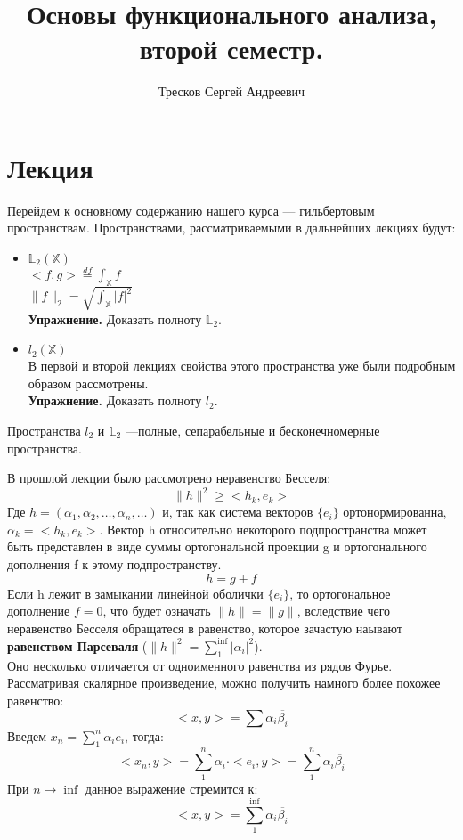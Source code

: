 \documentclass[12pt]{article}
\newcommand{\exc}{{\bfseries Упражнение. }}
\newcommand{\norm}[1]{\| #1 \|}
\newcommand{\scal}[2]{<#1, #2>}
\renewcommand{\geq}{\geqslant}
\begin{document}
	\title{Основы функционального анализа, второй семестр.}
	\author{Тресков Сергей Андреевич}
	\maketitle
	
	\section{Лекция}
	
	Перейдем к основному содержанию нашего курса --- гильбертовым пространствам. Пространствами, рассматриваемыми 
	в дальнейших лекциях будут:
	\begin{itemize}
		\item $\mathbb{L}_2(\mathbb{X})$ \\
		$\scal{f}{g} \overset{df}{=} \int_{\mathbb{X}} f$ \\
		$\norm{f}_2 = \sqrt{\int_{\mathbb{X}} |f|^2}$ \\
		\exc Доказать полноту $\mathbb{L}_2$.
		
		\item $l_2(\mathbb{X})$ \\
		В первой и второй лекциях свойства этого пространства уже были подробным образом рассмотрены. \\
		\exc Доказать полноту $l_2$.
	\end{itemize}
	Пространства $l_2$ и $\mathbb{L}_2$ ---полные, сепарабельные и бесконечномерные пространства.
	
	В прошлой лекции было рассмотрено неравенство Бесселя: \\
	$$\norm{h}^2 \geq \scal{h_k}{e_k}$$
	Где $h = (\alpha_1, \alpha_2, \ldots, \alpha_n, \ldots)$ и, так как система векторов $\{ e_i \}$ ортонормированна, 
	$\alpha_k = \scal{h_k}{e_k}$. Вектор h относительно некоторого подпространства может быть представлен в виде суммы
	ортогональной проекции g и ортогонального дополнения f к этому подпространству. 
	$$h = g + f$$
	Если h лежит в замыкании линейной оболички $\{ e_i \}$, то ортогональное дополнение $f = 0$, что будет означать 
	$\norm{h} = \norm{g}$, вследствие чего неравенство Бесселя обращатеся в равенство, которое зачастую наывают 
	\textbf{равенством Парсеваля} ($\norm{h}^2 = \sum_1^{\inf} |\alpha_i|^2$).\\
	Оно несколько отличается от одноименного равенства из рядов Фурье. Рассматривая скалярное произведение, можно получить
	намного более похожее равенство:
	$$ \scal{x}{y} = \sum \alpha_i \overline{\beta_i} $$
	Введем $x_n = \sum_1^n \alpha_i e_i$, тогда:
	$$ \scal{x_n}{y} = \sum_1^n \alpha_i \cdot \scal{e_i}{y} = \sum_1^n \alpha_i \overline{\beta_i}$$
	При $n \rightarrow \inf$ данное выражение стремится к:
	$$ \scal{x}{y} = \sum_1^{\inf} \alpha_i \overline{\beta_i} $$
	
\end{document}
